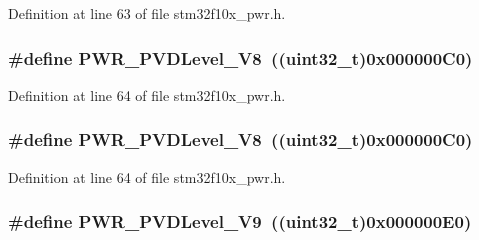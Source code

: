 Definition at line 63 of file stm32f10x\+\_\+pwr.\+h.

\subsubsection[{\texorpdfstring{P\+W\+R\+\_\+\+P\+V\+D\+Level\+\_\+2\+V8}{PWR_PVDLevel_2V8}}]{\setlength{\rightskip}{0pt plus 5cm}\#define P\+W\+R\+\_\+\+P\+V\+D\+Level\+\_\+V8~(({\bf uint32\+\_\+t})0x000000\+C0)}\hypertarget{group___p_v_d__detection__level_ga5f38835a95c026b1db16dbebf81b45a2}{}\label{group___p_v_d__detection__level_ga5f38835a95c026b1db16dbebf81b45a2}


Definition at line 64 of file stm32f10x\+\_\+pwr.\+h.

\subsubsection[{\texorpdfstring{P\+W\+R\+\_\+\+P\+V\+D\+Level\+\_\+2\+V8}{PWR_PVDLevel_2V8}}]{\setlength{\rightskip}{0pt plus 5cm}\#define P\+W\+R\+\_\+\+P\+V\+D\+Level\+\_\+V8~(({\bf uint32\+\_\+t})0x000000\+C0)}\hypertarget{group___p_v_d__detection__level_ga5f38835a95c026b1db16dbebf81b45a2}{}\label{group___p_v_d__detection__level_ga5f38835a95c026b1db16dbebf81b45a2}


Definition at line 64 of file stm32f10x\+\_\+pwr.\+h.

\subsubsection[{\texorpdfstring{P\+W\+R\+\_\+\+P\+V\+D\+Level\+\_\+2\+V9}{PWR_PVDLevel_2V9}}]{\setlength{\rightskip}{0pt plus 5cm}\#define P\+W\+R\+\_\+\+P\+V\+D\+Level\+\_\+V9~(({\bf uint32\+\_\+t})0x000000\+E0)}\hypertarget{group___p_v_d__detection__level_ga9c156a7155f9946c0d3a73794f51a1ce}{}\label{group___p_v_d__detection__level_ga9c156a7155f9946c0d3a73794f51a1ce}


